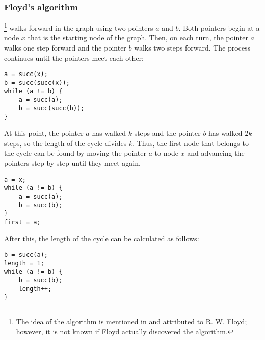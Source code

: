 \subsubsection{Floyd's algorithm}


\footnote{The idea of the algorithm is mentioned in \cite{knu982}
and attributed to R. W. Floyd; however, it is not known if Floyd actually
discovered the algorithm.} walks forward 
in the graph using two pointers $a$ and $b$.
Both pointers begin at a node $x$ that
is the starting node of the graph.
Then, on each turn, the pointer $a$ walks
one step forward and the pointer $b$
walks two steps forward.
The process continues until
the pointers meet each other:
\begin{lstlisting}
a = succ(x);
b = succ(succ(x));
while (a != b) {
    a = succ(a);
    b = succ(succ(b));
}
\end{lstlisting}

At this point, the pointer $a$ has walked $k$ steps
and the pointer $b$ has walked $2k$ steps,
so the length of the cycle divides $k$.
Thus, the first node that belongs to the cycle
can be found by moving the pointer $a$ to node $x$
and advancing the pointers
step by step until they meet again.
\begin{lstlisting}
a = x;
while (a != b) {
    a = succ(a);
    b = succ(b);
}
first = a;
\end{lstlisting}

After this, the length of the cycle
can be calculated as follows:
\begin{lstlisting}
b = succ(a);
length = 1;
while (a != b) {
    b = succ(b);
    length++;
}
\end{lstlisting}
